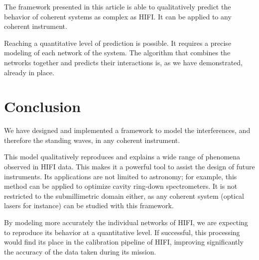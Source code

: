 \documentclass[journal]{IEEEtran}
\begin{document}
The framework presented in this article is able to qualitatively predict the behavior of coherent systems as complex as HIFI.
It can be applied to any coherent instrument.

Reaching a quantitative level of prediction is possible.
It requires a precise modeling of each network of the system.
The algorithm that combines the networks together and predicts their interactions is, as we have demonstrated, already in place.





\section{Conclusion}
We have designed and implemented a framework to model the interferences, and therefore the standing waves, in any coherent instrument.

This model qualitatively reproduces and explains a wide range of phenomena observed in HIFI data.
This makes it a powerful tool to assist the design of future instruments.
Its applications are not limited to astronomy; for example, this method can be applied to optimize cavity ring-down spectrometers.
It is not restricted to the submillimetric domain either, as any coherent system (optical lasers for instance) can be studied with this framework.

By modeling more accurately the individual networks of HIFI, we are expecting to reproduce its behavior at a quantitative level.
If successful, this processing would find its place in the calibration pipeline of HIFI, improving significantly the accuracy of the data taken during its mission.


%
%
\end{document}
